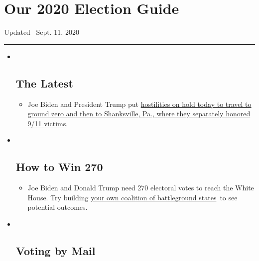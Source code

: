\hypertarget{our-2020-election-guide}{%
\section{Our 2020 Election Guide}\label{our-2020-election-guide}}

Updated ~Sept. 11, 2020

\begin{center}\rule{0.5\linewidth}{\linethickness}\end{center}

\begin{itemize}
\item ~
  \hypertarget{the-latest}{%
  \subsection{The Latest}\label{the-latest}}

  \begin{itemize}
  \item
    Joe Biden and President Trump put
    \href{https://www.nytimes3xbfgragh.onion/2020/09/11/us/politics/shanksville-trump-biden.html?action=click\&pgtype=Article\&state=default\&region=BELOW_MAIN_CONTENT\&context=storylines_guide}{hostilities
    on hold today to travel to ground zero and then to Shanksville, Pa.,
    where they separately honored 9/11 victims}.
  \end{itemize}
\item ~
  \hypertarget{how-to-win-270}{%
  \subsection{How to Win 270}\label{how-to-win-270}}

  \begin{itemize}
  \item
    Joe Biden and Donald Trump need 270 electoral votes to reach the
    White House. Try building
    \href{https://www.nytimes3xbfgragh.onion/interactive/2020/us/elections/election-states-biden-trump.html?action=click\&pgtype=Article\&state=default\&region=BELOW_MAIN_CONTENT\&context=storylines_guide}{your
    own coalition of battleground states}~to see potential outcomes.
  \end{itemize}
\item ~
  \hypertarget{voting-by-mail}{%
  \subsection{Voting by Mail}\label{voting-by-mail}}


\end{itemize}
